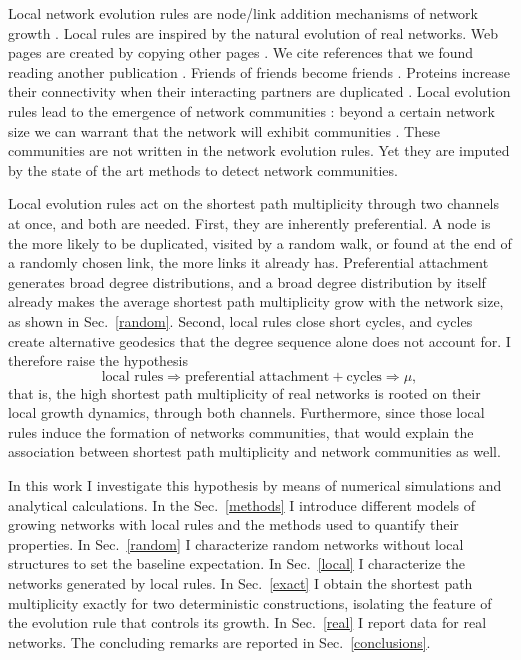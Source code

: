 \documentclass[reprint,aps,pre,amsmath,amssymb,superscriptaddress,showpacs]{revtex4-1}
\begin{document}
Local network evolution rules are node/link addition mechanisms of network growth \cite{vazquez03local}. Local rules are inspired by the natural evolution of real networks. Web pages are created by copying other pages \cite{kleinberg99}. We cite references that we found reading another publication \cite{vazquez01rs, vazquez01citation}. Friends of friends become friends \cite{growing_social_networks_jin01, communities_bianconi_2014}.  Proteins increase their connectivity when their interacting partners are duplicated \cite{vazquez03dup, pastor-satorras03, chung03, copying_krapivsky_2005}. Local evolution rules lead to the emergence of network communities \cite{growing_social_networks_jin01, sole_spontaneous_2007, communities_bianconi_2014}: beyond a certain network size we can warrant that the network will exhibit communities \cite{vazquez2025local}. These communities are not written in the network evolution rules. Yet they are imputed by the state of the art methods to detect network communities.

Local evolution rules act on the shortest path multiplicity through two channels at once, and both are needed. First, they are inherently preferential. A node is the more likely to be duplicated, visited by a random walk, or found at the end of a randomly chosen link, the more links it already has. Preferential attachment generates broad degree distributions, and a broad degree distribution by itself already makes the average shortest path multiplicity grow with the network size, as shown in Sec.~\ref{random}. Second, local rules close short cycles, and cycles create alternative geodesics that the degree sequence alone does not account for. I therefore raise the hypothesis
%
\[
\mbox{local rules} \Rightarrow \mbox{preferential attachment} + \mbox{cycles} \Rightarrow \mu,
\]
%
that is, the high shortest path multiplicity of real networks is rooted on their local growth dynamics, through both channels. Furthermore, since those local rules induce the formation of networks communities, that would explain the association between shortest path multiplicity and network communities as well.

In this work I investigate this hypothesis by means of numerical simulations and analytical calculations. In the Sec.~\ref{methods} I introduce different models of growing networks with local rules and the methods used to quantify their properties. In Sec.~\ref{random} I characterize random networks without local structures to set the baseline expectation. In Sec.~\ref{local} I characterize the networks generated by local rules. In Sec.~\ref{exact} I obtain the shortest path multiplicity exactly for two deterministic constructions, isolating the feature of the evolution rule that controls its growth.  In Sec.~\ref{real} I report data for real networks.  The concluding remarks are reported in Sec.~\ref{conclusions}.
\end{document}
